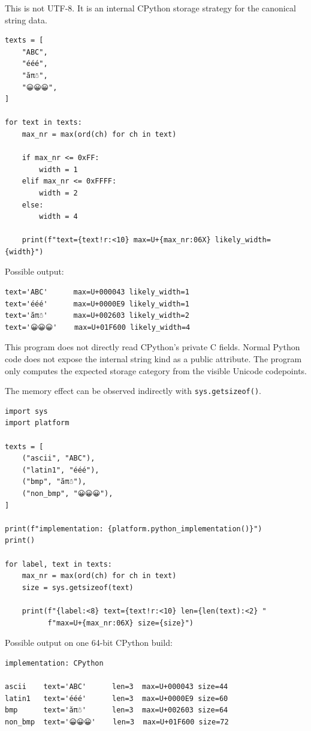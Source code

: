 This is not UTF-8. It is an internal CPython storage strategy for the canonical string data.

\begin{verbatim}
texts = [
    "ABC",
    "ééé",
    "ăπ☃",
    "😀😀😀",
]

for text in texts:
    max_nr = max(ord(ch) for ch in text)

    if max_nr <= 0xFF:
        width = 1
    elif max_nr <= 0xFFFF:
        width = 2
    else:
        width = 4

    print(f"text={text!r:<10} max=U+{max_nr:06X} likely_width={width}")
\end{verbatim}

Possible output:

\begin{verbatim}
text='ABC'      max=U+000043 likely_width=1
text='ééé'      max=U+0000E9 likely_width=1
text='ăπ☃'      max=U+002603 likely_width=2
text='😀😀😀'    max=U+01F600 likely_width=4
\end{verbatim}

This program does not directly read CPython's private C fields. Normal Python code does not expose the internal string kind as a public attribute. The program only computes the expected storage category from the visible Unicode codepoints.

The memory effect can be observed indirectly with \texttt{sys.getsizeof()}.

\begin{verbatim}
import sys
import platform

texts = [
    ("ascii", "ABC"),
    ("latin1", "ééé"),
    ("bmp", "ăπ☃"),
    ("non_bmp", "😀😀😀"),
]

print(f"implementation: {platform.python_implementation()}")
print()

for label, text in texts:
    max_nr = max(ord(ch) for ch in text)
    size = sys.getsizeof(text)

    print(f"{label:<8} text={text!r:<10} len={len(text):<2} "
          f"max=U+{max_nr:06X} size={size}")
\end{verbatim}

Possible output on one 64-bit CPython build:

\begin{verbatim}
implementation: CPython

ascii    text='ABC'      len=3  max=U+000043 size=44
latin1   text='ééé'      len=3  max=U+0000E9 size=60
bmp      text='ăπ☃'      len=3  max=U+002603 size=64
non_bmp  text='😀😀😀'    len=3  max=U+01F600 size=72
\end{verbatim}

